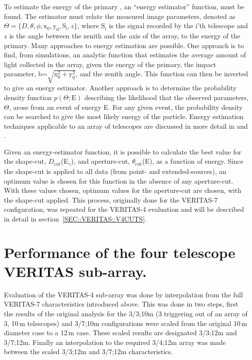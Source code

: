 To estimate the energy of the primary \Grayc, an ``energy estimator''
function, must be found. The estimator must relate the measured image
parameters, denoted as $\Theta=\{D, \theta, \phi, \mathrm{x}_0,
\mathrm{y}_0, \mathrm{S_i}, z\}$, where S$_\mathrm{i}$ is the signal 
recorded by the i'th telescope and $z$ is the angle between the zenith
and the axis of the array, to the energy of the primary. Many
approaches to energy estimation are possible. One approach is to find,
from simulations, an analytic function that estimates the average
amount of light collected in the array, given the energy of the
primary, the impact parameter,
\mbox{b=$\sqrt{\mathrm{x}_0^2+\mathrm{y}_0^2}$}, and the zenith
angle. This function can then be inverted to give an energy
estimator. Another approach is to determine the probability density
function $p(\Theta;\mathrm{E})$ describing the likelihood that the
observed parameters, $\Theta$, arose from an event of energy E. For
any given event, the probability density can be searched to give the
most likely energy of the particle. Energy estimation techniques
applicable to an array of telescopes are discussed in more detail in
\citet{REF::HOFMANN::1997KRUGER} and \citet{REF::AHARONIAN::1999AA342}.

Given an energy-estimator function, it is possible to calculate the
best value for the shape-cut, $D_{\mathrm{cut}}$(E$_\gamma$), and
aperture-cut, $\theta_{\mathrm{cut}}$(E), as a function of
energy. Since the shape-cut is applied to all data (from point- and
extended-sources), an optimum value is chosen for this function in the
absence of any aperture-cut. With these values chosen, optimum values
for the aperture-cut are chosen, with the shape-cut applied. This
process, originally done for the VERITAS-7 configuration, was repeated
for the VERITAS-4 evaluation and will be described in detail in
section~\ref{SEC::VERITAS::V4CUTS}.

\section{Performance of the four telescope VERITAS sub-array.}
\label{SEC::VERITAS::V4}

Evaluation of the VERITAS-4 sub-array was done by interpolation from
the full VERITAS-7 characteristics introduced above. This was done in
two steps, first the results of the original analysis for the 3/3;10m
(3 triggering out of an array of 3, 10\,m telescopes) and 3/7;10m
configurations were scaled from the original 10\,m diameter case to a
12\,m case. These scaled results are designated 3/3;12m and
3/7;12m. Finally an interpolation to the required 3/4;12m array was
made between the scaled 3/3;12m and 3/7;12m characteristics.


